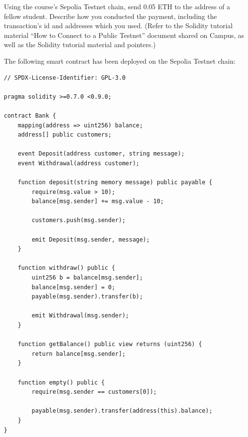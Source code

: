 \documentclass[12pt,addpoints,answers]{exam}
\begin{document}
\begin{questions}
    

\newpage

\question[10] Using the course’s Sepolia  Testnet chain, send 0.05 ETH to the address of a fellow student. Describe how you conducted the payment, including the transaction’s id and addresses which you used. (Refer to the Solidity tutorial material “How to Connect
to a Public Testnet” document shared on Campus, as well as the Solidity
tutorial material and pointers.) 

    

\newpage
  
\question The following smart contract has been deployed on the Sepolia Testnet chain:

{\footnotesize

\begin{verbatim}
// SPDX-License-Identifier: GPL-3.0

pragma solidity >=0.7.0 <0.9.0;

contract Bank {
    mapping(address => uint256) balance;
    address[] public customers;

    event Deposit(address customer, string message);
    event Withdrawal(address customer);

    function deposit(string memory message) public payable {
        require(msg.value > 10);
        balance[msg.sender] += msg.value - 10;

        customers.push(msg.sender);

        emit Deposit(msg.sender, message);
    }

    function withdraw() public {
        uint256 b = balance[msg.sender];
        balance[msg.sender] = 0;
        payable(msg.sender).transfer(b);

        emit Withdrawal(msg.sender);
    }

    function getBalance() public view returns (uint256) {
        return balance[msg.sender];
    }
    
    function empty() public {
        require(msg.sender == customers[0]);
        
        payable(msg.sender).transfer(address(this).balance);
    }
}
\end{verbatim}

}
\end{questions}
\end{document}
